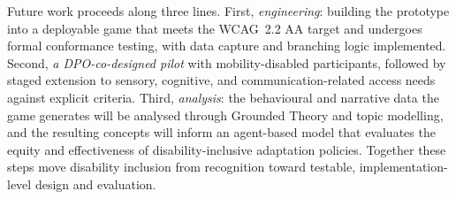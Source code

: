 \documentclass[sigconf]{acmart}
\begin{document}
Future work proceeds along three lines. First, \emph{engineering}:
building the prototype into a deployable game that meets the WCAG~2.2 AA
target and undergoes formal conformance testing, with data capture and
branching logic implemented. Second, \emph{a DPO-co-designed pilot} with
mobility-disabled participants, followed by staged extension to sensory,
cognitive, and communication-related access needs against explicit
criteria. Third, \emph{analysis}: the behavioural and narrative data the
game generates will be analysed through Grounded Theory and topic
modelling, and the resulting concepts will inform an agent-based model
that evaluates the equity and effectiveness of disability-inclusive
adaptation policies. Together these steps move disability inclusion from
recognition toward testable, implementation-level design and evaluation.



\end{document}
